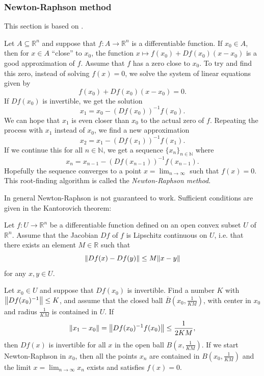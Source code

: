 \subsubsection{Newton-Raphson method}\label{sec:newton-raphson method}

This section is based on \cite[Section 5.6]{FVA}.

Let $A\subseteq\mathbb{R}^n$ and suppose that $f\colon A \to\mathbb{R}^n$ is a differentiable function. If $x_0\in A$, then for $x\in A$ “close” to $x_0$, the function $x\mapsto f(x_0)+Df(x_0)(x-x_0)$ is a good approximation of $f$. Assume that $f$ has a zero close to $x_0$. To try and find this zero, instead of solving $f(x)=0$, we solve the system of linear equations given by
\begin{equation*}
  f(x_0)+Df(x_0)(x-x_0) = 0.
\end{equation*}
If $Df(x_0)$ is invertible, we get the solution
\begin{equation*}
  x_1=x_0-(Df(x_0))^{-1}f(x_0).
\end{equation*}
We can hope that $x_1$ is even closer than $x_0$ to the actual zero of $f$. Repeating the process with $x_1$ instead of $x_0$, we find a new approximation
\begin{equation*}
  x_2=x_1-(Df(x_1))^{-1}f(x_1).
\end{equation*}
If we continue this for all $n\in\mathbb{N}$, we get a sequence $\{x_n\}_{n\in\mathbb{N}}$ where
\begin{equation*}
  x_n=x_{n-1}-(Df(x_{n-1}))^{-1}f(x_{n-1}).
\end{equation*}
Hopefully the sequence converges to a point $x=\lim_{n\to\infty}$ such that $f(x)=0$. This root-finding algorithm is called the \emph{Newton-Raphson method}.

In general Newton-Raphson is not guaranteed to work. Sufficient conditions are given in the Kantorovich theorem:
\begin{theorem}
  Let $f\colon U\to\mathbb{R}^n$ be a differentiable function defined on an open convex subset $U$ of $\mathbb{R}^n$. Assume that the Jacobian $Df$ of $f$ is Lipschitz continuous on $U$, i.e. that there exists an element $M\in\mathbb{R}$ such that
  \begin{equation*}
    \norm{Df(x)-Df(y)}\le M\norm{x-y}
  \end{equation*}
  for any $x,y\in U$.

Let $x_0\in U$ and suppose that $Df(x_0)$ is invertible. Find a number $K$ with $\norm{Df(x_0)^{-1}}\le K$, and assume that the closed ball $\overline{B}\left(x_0,\frac{1}{KM}\right)$, with center in $x_0$ and radius $\frac{1}{KM}$ is contained in $U$. If
\begin{equation*}
  \norm{x_1-x_0}=\norm{Df(x_0)^{-1}f(x_0)}\le\frac{1}{2KM},
\end{equation*}
then $Df(x)$ is invertible for all $x$ in the open ball $B\left(x,\frac{1}{KM}\right)$. If we start Newton-Raphson in $x_0$, then all the points $x_n$ are contained in $B\left(x_0,\frac{1}{KM}\right)$ and the limit $x=\lim_{n\to\infty}x_n$ exists and satisfies $f(x)=0$.
\end{theorem}

